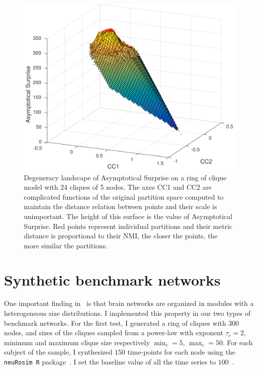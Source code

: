 \begin{figure}[!htb]
\centering
\includegraphics[width=1.0\textwidth]{images/filtered_asymp_surp_ring_cliques_5_24_200.png}
\caption{Degeneracy landscape of Asymptotical Surprise on a ring of clique model with 24 cliques of 5 nodes.
The axes CC1 and CC2 are complicated functions of the original partition space computed to maintain the distance relation between points and their scale is unimportant.
The height of this surface is the value of Asymptotical Surprise.
Red points represent individual partitions and their metric distance is proportional to their NMI, the closer the points, the more similar the partitions.}
\label{fig:degeneracy_asymptotical_surprise}
\end{figure}


\section{Synthetic benchmark networks}
One important finding in~\cite{nicolini2016} is that brain networks are organized in modules with a heterogeneous size distributions.
I implemented this property in our two types of benchmark networks.
For the first test, I generated a ring of cliques with $300$ nodes, and sizes of the cliques sampled from a power-law with exponent $\tau_c=2$, minimum and maximum clique size respectively $\min_c=5$, $\max_c=50$.
For each subject of the sample, I synthesized $150$ time-points for each node using the \texttt{neuRosim R} package~\cite{neurosim2011}.
I set the baseline value of all the time series to $100$~\cite{welvaert2013}.

